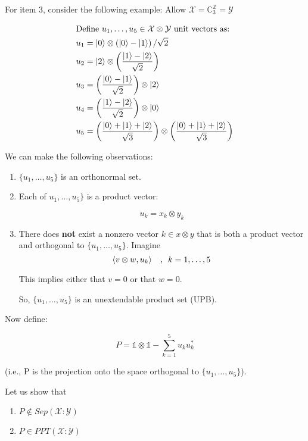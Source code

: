 \documentclass{article}
\begin{document}
For item 3, consider the following example: Allow $ \mathcal{X} =
\mathbb{C}^\mathbb{Z}_3 = \mathcal{Y} $ 

\begin{align*}
    \intertext{Define $u_1,\ldots,u_5 \in \mathcal{X}\otimes \mathcal{Y}$ unit
    vectors as: }
    u_1 &= \ket{0} \otimes \left( \ket{0} - \ket{1} \right) / \sqrt{2} \\
    u_2 &= \ket{2} \otimes \left( \frac{\ket{1}-\ket{2}}{\sqrt{2}} \right) \\
    u_3 &= \left( \frac{\ket{0}-\ket{1}}{\sqrt{2}} \right) \otimes \ket{2} \\
    u_4 &= \left( \frac{\ket{1}-\ket{2}}{\sqrt{2}} \right) \otimes \ket{0} \\
    u_5 &= \left( \frac{\ket{0}+\ket{1}+\ket{2}}{\sqrt{3}} \right) \otimes
    \left( \frac{\ket{0} + \ket{1} + \ket{2}}{\sqrt{3}} \right)
\end{align*}

We can make the following observations:

\begin{enumerate}
    \item $\{u_1,\ldots,u_5\}$ is an orthonormal set.
    \item Each of $u_1,\ldots,u_5 \}$ is a product vector:

        \[ 
            u_k = x_k \otimes y_k 
        \]
        
    \item There does \textbf{not} exist a nonzero vector $k \in x \otimes y$
        that is both a product vector and orthogonal to $\{u_1, \ldots, u_5 \}$.
        Imagine 
        \[ 
            \langle v\otimes w , u_k \rangle \quad,\enskip k=1,\ldots,5 
        \]

        This implies either that $v=0$ or that $w=0$.

        So, $\{u_1,\ldots,u_5\}$ is an unextendable product set (UPB).
\end{enumerate}

Now define:

\[ 
    P = \mathds{1} \otimes \mathds{1} - \sum_{k=1}^5 u_k u_k^* 
\]

(i.e., P is the projection onto the space orthogonal to $ \{u_1,\ldots,u_5\} $).

Let us show that 

\begin{enumerate}
    \item $P \notin Sep(\mathcal{X}:\mathcal{Y})$
    \item $P \in PPT(\mathcal{X}:\mathcal{Y})$
\end{enumerate}
\end{document}
